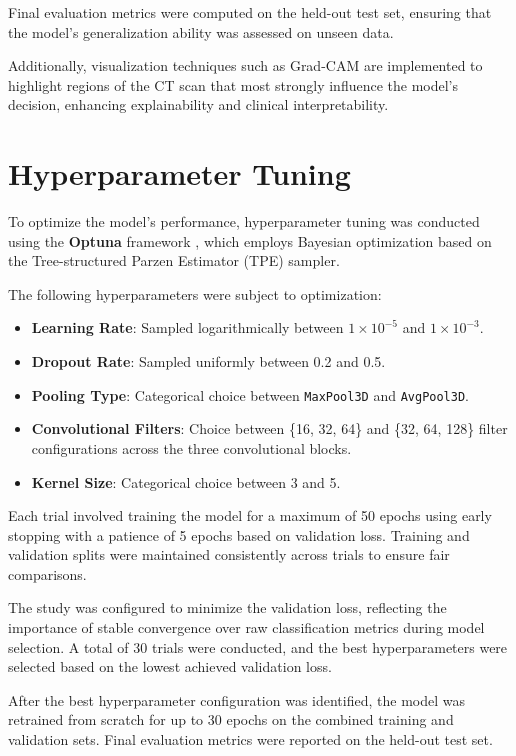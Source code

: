 \documentclass[12pt, BSc]{muthesis}
\begin{document}
Final evaluation metrics were computed on the held-out test set, ensuring that the model's generalization ability was assessed on unseen data.

Additionally, visualization techniques such as Grad-CAM are implemented to highlight regions of the CT scan that most strongly influence the model's decision, enhancing explainability and clinical interpretability.

\section{Hyperparameter Tuning}

To optimize the model's performance, hyperparameter tuning was conducted using the \textbf{Optuna} framework \cite{TODO}, which employs Bayesian optimization based on the Tree-structured Parzen Estimator (TPE) sampler.

The following hyperparameters were subject to optimization:

\begin{itemize}
    \item \textbf{Learning Rate}: Sampled logarithmically between $1 \times 10^{-5}$ and $1 \times 10^{-3}$.
    \item \textbf{Dropout Rate}: Sampled uniformly between 0.2 and 0.5.
    \item \textbf{Pooling Type}: Categorical choice between \texttt{MaxPool3D} and \texttt{AvgPool3D}.
    \item \textbf{Convolutional Filters}: Choice between \{16, 32, 64\} and \{32, 64, 128\} filter configurations across the three convolutional blocks.
    \item \textbf{Kernel Size}: Categorical choice between 3 and 5.
\end{itemize}

Each trial involved training the model for a maximum of 50 epochs using early stopping with a patience of 5 epochs based on validation loss.  
Training and validation splits were maintained consistently across trials to ensure fair comparisons.

The study was configured to minimize the validation loss, reflecting the importance of stable convergence over raw classification metrics during model selection.  
A total of 30 trials were conducted, and the best hyperparameters were selected based on the lowest achieved validation loss.

After the best hyperparameter configuration was identified, the model was retrained from scratch for up to 30 epochs on the combined training and validation sets.  
Final evaluation metrics were reported on the held-out test set.
\end{document}
